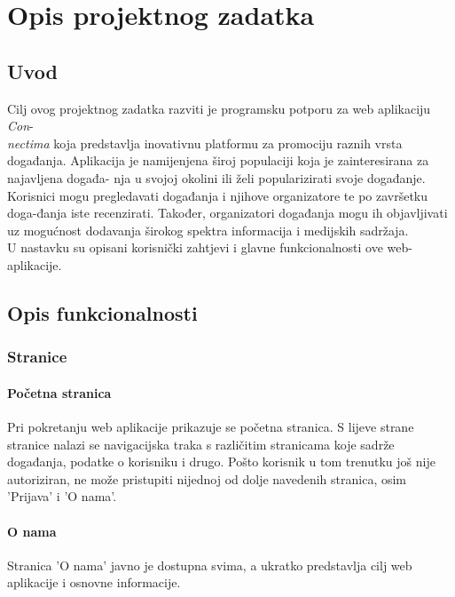 \chapter{Opis projektnog zadatka}
				
		\section{Uvod}
		
			Cilj ovog projektnog zadatka razviti je programsku potporu za web aplikaciju \textit{Con}-\\
			\textit{nectima} koja predstavlja inovativnu platformu za promociju raznih vrsta događanja. Aplikacija je namijenjena široj populaciji koja je zainteresirana za najavljena događa-
			nja u svojoj okolini ili želi popularizirati svoje događanje. \\ Korisnici mogu pregledavati događanja i njihove organizatore te po završetku doga-đanja iste recenzirati. Također, organizatori događanja mogu ih objavljivati uz mogućnost dodavanja širokog spektra informacija i medijskih sadržaja.\\
			U nastavku su opisani korisnički zahtjevi i glavne funkcionalnosti ove web-aplikacije.
		
		
		
		\section{Opis funkcionalnosti}
		
			\subsection{Stranice}
			
				\subsubsection{Početna stranica}
				Pri pokretanju web aplikacije prikazuje se početna stranica. S lijeve strane stranice nalazi se navigacijska traka s različitim stranicama koje sadrže događanja, podatke o korisniku i drugo. Pošto korisnik u tom trenutku još nije autoriziran, ne može pristupiti nijednoj od dolje navedenih stranica, osim 'Prijava' i 'O nama'.
				
				\subsubsection{O nama}
				Stranica 'O nama' javno je dostupna svima, a ukratko predstavlja cilj web aplikacije i osnovne informacije.
				
